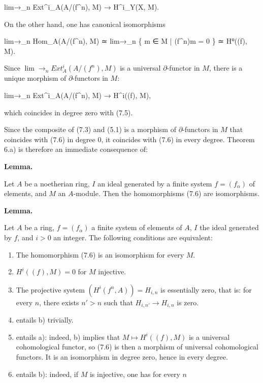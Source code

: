 \documentclass[
  11pt,
  a4paper,
]{book}
\newenvironment{Shaded}{}{}
\newcommand{\NormalTok}[1]{#1}
\begin{document}
\begin{Shaded}
\begin{Highlighting}[]
\NormalTok{lim→\_n Ext\^{}i\_A(A/(f\^{}n), M) → H\^{}i\_Y(X, M).}
\end{Highlighting}
\end{Shaded}

On the other hand, one has canonical isomorphisms

\begin{Shaded}
\begin{Highlighting}[]
\NormalTok{lim→\_n Hom\_A(A/(f\^{}n), M) ≃ lim→\_n \{ m ∈ M | (f\^{}n)m = 0 \} ≃ H⁰((f), M).}
\end{Highlighting}
\end{Shaded}

Since \(\lim\to_{n} Ext^{i}_{A}(A/(f^{n}), M)\) is a universal
\(\partial\)-functor in \(M\), there is a unique morphism of
\(\partial\)-functors in \(M\):

\begin{Shaded}
\begin{Highlighting}[]
\NormalTok{lim→\_n Ext\^{}i\_A(A/(f\^{}n), M) → H\^{}i((f), M),}
\end{Highlighting}
\end{Shaded}

which coincides in degree zero with (7.5).

Since the composite of (7.3) and (5.1) is a morphism of
\(\partial\)-functors in \(M\) that coincides with (7.6) in degree 0, it
coincides with (7.6) in every degree. Theorem 6.a) is therefore an
immediate consequence of:

\textbf{Lemma.}

Let \(A\) be a noetherian ring, \(I\) an ideal generated by a finite
system \(f = (f_{\alpha})\) of elements, and \(M\) an \(A\)-module. Then
the homomorphisms (7.6) are isomorphisms.

\textbf{Lemma.}

Let \(A\) be a ring, \(f = (f_{\alpha})\) a finite system of elements of
\(A\), \(I\) the ideal generated by \(f\), and \(i > 0\) an integer. The
following conditions are equivalent:

\begin{enumerate}
\def\labelenumi{\alph{enumi})}
\item
  The homomorphism (7.6) is an isomorphism for every \(M\).
\item
  \(H^{i}((f), M) = 0\) for \(M\) injective.
\item
  The projective system \((H^{i}(f^{n}, A)) = H_{i,n}\) is essentially
  zero, that is: for every \(n\), there exists \(n' >
  n\) such that \(H_{i,n'} \to H_{i,n}\) is zero.
\item
  entails b) trivially.
\item
  entails a): indeed, b) implies that \(M \mapsto H^{i}((f), M)\) is a
  universal cohomological functor, so (7.6) is then a morphism of
  universal cohomological functors. It is an isomorphism in degree zero,
  hence in every degree.
\item
  entails b): indeed, if \(M\) is injective, one has for every \(n\)
\end{enumerate}
\end{document}
